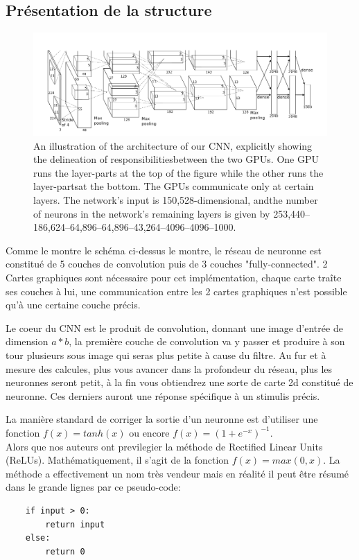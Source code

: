 \documentclass[12pt, letterpaper]{article}
\begin{document}
\subsection{Présentation de la structure}
\begin{figure}[H]
    \includegraphics[width=\linewidth]{img/fig7.png}
    \caption{An illustration of the architecture of our CNN, explicitly showing the delineation of responsibilitiesbetween the two GPUs. One GPU runs the layer-parts at the top of the figure while the other runs the layer-partsat the bottom. The GPUs communicate only at certain layers. The network’s input is 150,528-dimensional, andthe number of neurons in the network’s remaining layers is given by 253,440–186,624–64,896–64,896–43,264–4096–4096–1000.}
    \label{fig:L7}
\end{figure}
Comme le montre le schéma ci-dessus le montre, le réseau de neuronne est constitué de 5 couches de convolution puis de 3 couches "fully-connected".
2 Cartes graphiques sont nécessaire pour cet implémentation, chaque carte traîte ses couches à lui, une communication entre les 2 cartes graphiques n'est 
possible qu'à une certaine couche précis.
\par Le coeur du CNN est le produit de convolution, donnant une image d'entrée de dimension $a*b$, la première couche de convolution va y passer et produire 
à son tour plusieurs sous image qui seras plus petite à cause du filtre. Au fur et à mesure des calcules, plus vous avancer dans la profondeur du réseau, plus les neuronnes seront petit, 
à la fin vous obtiendrez une sorte de carte 2d constitué de neuronne. Ces derniers auront une réponse spécifique à un stimulis précis.
\par La manière standard de corriger la sortie d'un neuronne est d'utiliser une fonction $f(x) = tanh(x)$ ou encore 
$f(x) = (1 + e^{-x})^{-1}$.\\
Alors que nos auteurs ont previlegier la méthode de Rectified Linear Units (ReLUs). \autocite{NairHinton:4}
Mathématiquement, il s'agit de la fonction $f(x) = max(0,x)$. La méthode a effectivement un nom très vendeur mais en réalité
il peut être résumé dans le grande lignes par ce pseudo-code:
\begin{verbatim}
    if input > 0:
	    return input
    else:
	    return 0
\end{verbatim}
\end{document}
